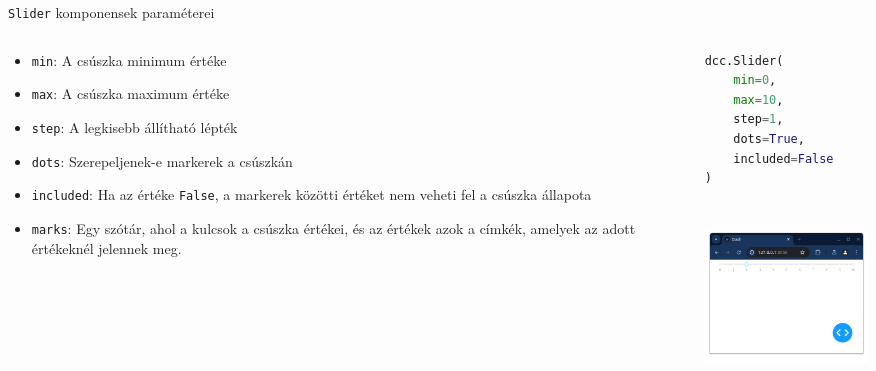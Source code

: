 \documentclass[english, aspectratio=169]{beamer}
\begin{document}
\begin{frame}[fragile]{\texttt{Slider} komponensek paraméterei}
	\begin{columns}
		\begin{column}{.5\textwidth}
			\begin{itemize}
				\item \texttt{min}: A csúszka minimum értéke
				\item \texttt{max}: A csúszka maximum értéke
				\item \texttt{step}: A legkisebb állítható lépték
				\item \texttt{dots}: Szerepeljenek-e markerek a csúszkán
				\item \texttt{included}: Ha az értéke \texttt{False}, a markerek közötti értéket nem veheti fel a csúszka állapota
				\item \texttt{marks}: Egy szótár, ahol a kulcsok a csúszka értékei, és az értékek azok a címkék, amelyek az adott értékeknél jelennek meg.
			\end{itemize}
		\end{column}
		\begin{column}{.5\textwidth}
			\begin{lstlisting}[language=python]
dcc.Slider(
	min=0,
	max=10,
	step=1,
	dots=True,
	included=False
)				
			\end{lstlisting}
			\begin{center}
				\includegraphics[width=5cm, height=5cm, keepaspectratio]{images/scatter_17.png}
			\end{center}
		\end{column}
	\end{columns}
\end{frame}
\end{document}
